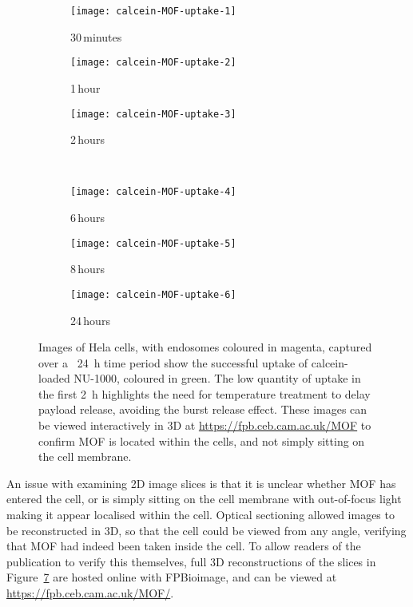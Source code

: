 \begin{figure}[tbp]
\centering
\begin{subfigure}[b]{0.325\textwidth}
	\texttt{[image: calcein-MOF-uptake-1]}
	\caption{30\,minutes}\label{fig:calcein-MOF-uptake-1}
\end{subfigure}
\hfill
\begin{subfigure}[b]{0.325\textwidth}
	\texttt{[image: calcein-MOF-uptake-2]}
	\caption{1\,hour}\label{fig:calcein-MOF-uptake-2}
\end{subfigure}
\hfill
\begin{subfigure}[b]{0.325\textwidth}
	\texttt{[image: calcein-MOF-uptake-3]}
	\caption{2\,hours}\label{fig:calcein-MOF-uptake-3}
\end{subfigure}

~\newline
\begin{subfigure}[b]{0.325\textwidth}
	\texttt{[image: calcein-MOF-uptake-4]}
	\caption{6\,hours}\label{fig:calcein-MOF-uptake-4}
\end{subfigure}
\hfill
\begin{subfigure}[b]{0.325\textwidth}
	\texttt{[image: calcein-MOF-uptake-5]}
	\caption{8\,hours}\label{fig:calcein-MOF-uptake-5}
\end{subfigure}
\hfill
\begin{subfigure}[b]{0.325\textwidth}
	\texttt{[image: calcein-MOF-uptake-6]}
	\caption{24\,hours}\label{fig:calcein-MOF-uptake-6}
\end{subfigure}
\caption[MOFs: Calcein-loaded NU-1000 is taken up by cells over a \SI{24}{\hour} period]{Images of Hela cells, with endosomes coloured in magenta, captured over a ~\SI{24}{\hour} time period show the successful uptake of calcein-loaded NU-1000, coloured in green. The low quantity of uptake in the first \SI{2}{\hour} highlights the need for temperature treatment to delay payload release, avoiding the burst release effect. These images can be viewed interactively in 3D at \url{https://fpb.ceb.cam.ac.uk/MOF} to confirm MOF is located within the cells, and not simply sitting on the cell membrane. }
\label{fig:calcein-MOF-uptake}
\end{figure}

An issue with examining 2D image slices is that it is unclear whether MOF has entered the cell, or is simply sitting on the cell membrane with out-of-focus light making it appear localised within the cell. 
Optical sectioning allowed images to be reconstructed in 3D, so that the cell could be viewed from any angle, verifying that MOF had indeed been taken inside the cell. 
To allow readers of the publication to verify this themselves, full 3D reconstructions of the slices in Figure~\ref{fig:calcein-MOF-uptake} are hosted online with FPBioimage, and can be viewed at \url{https://fpb.ceb.cam.ac.uk/MOF/}. 

